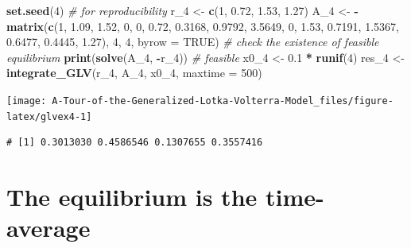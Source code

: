 \documentclass[]{book}
\newenvironment{Shaded}{\begin{snugshade}}{\end{snugshade}}
\newcommand{\CommentTok}[1]{\textcolor[rgb]{0.56,0.35,0.01}{\textit{#1}}}
\newcommand{\DataTypeTok}[1]{\textcolor[rgb]{0.13,0.29,0.53}{#1}}
\newcommand{\DecValTok}[1]{\textcolor[rgb]{0.00,0.00,0.81}{#1}}
\newcommand{\FloatTok}[1]{\textcolor[rgb]{0.00,0.00,0.81}{#1}}
\newcommand{\KeywordTok}[1]{\textcolor[rgb]{0.13,0.29,0.53}{\textbf{#1}}}
\newcommand{\NormalTok}[1]{#1}
\newcommand{\OperatorTok}[1]{\textcolor[rgb]{0.81,0.36,0.00}{\textbf{#1}}}
\newcommand{\OtherTok}[1]{\textcolor[rgb]{0.56,0.35,0.01}{#1}}
\newcommand{\StringTok}[1]{\textcolor[rgb]{0.31,0.60,0.02}{#1}}
\begin{document}
\begin{Shaded}
\begin{Highlighting}[]
\KeywordTok{set.seed}\NormalTok{(}\DecValTok{4}\NormalTok{) }\CommentTok{# for reproducibility}
\NormalTok{r_}\DecValTok{4}\NormalTok{ <-}\StringTok{ }\KeywordTok{c}\NormalTok{(}\DecValTok{1}\NormalTok{, }\FloatTok{0.72}\NormalTok{, }\FloatTok{1.53}\NormalTok{, }\FloatTok{1.27}\NormalTok{)}
\NormalTok{A_}\DecValTok{4}\NormalTok{ <-}\StringTok{ }\OperatorTok{-}\KeywordTok{matrix}\NormalTok{(}\KeywordTok{c}\NormalTok{(}\DecValTok{1}\NormalTok{, }\FloatTok{1.09}\NormalTok{, }\FloatTok{1.52}\NormalTok{, }\DecValTok{0}\NormalTok{, }
                 \DecValTok{0}\NormalTok{, }\FloatTok{0.72}\NormalTok{, }\FloatTok{0.3168}\NormalTok{, }\FloatTok{0.9792}\NormalTok{, }
                 \FloatTok{3.5649}\NormalTok{, }\DecValTok{0}\NormalTok{, }\FloatTok{1.53}\NormalTok{, }\FloatTok{0.7191}\NormalTok{,}
                 \FloatTok{1.5367}\NormalTok{, }\FloatTok{0.6477}\NormalTok{, }\FloatTok{0.4445}\NormalTok{, }\FloatTok{1.27}\NormalTok{), }\DecValTok{4}\NormalTok{, }\DecValTok{4}\NormalTok{, }\DataTypeTok{byrow =} \OtherTok{TRUE}\NormalTok{)}
\CommentTok{# check the existence of feasible equilibrium}
\KeywordTok{print}\NormalTok{(}\KeywordTok{solve}\NormalTok{(A_}\DecValTok{4}\NormalTok{, }\OperatorTok{-}\NormalTok{r_}\DecValTok{4}\NormalTok{)) }\CommentTok{# feasible}
\NormalTok{x0_}\DecValTok{4}\NormalTok{ <-}\StringTok{ }\FloatTok{0.1} \OperatorTok{*}\StringTok{ }\KeywordTok{runif}\NormalTok{(}\DecValTok{4}\NormalTok{)}
\NormalTok{res_}\DecValTok{4}\NormalTok{ <-}\StringTok{ }\KeywordTok{integrate_GLV}\NormalTok{(r_}\DecValTok{4}\NormalTok{, A_}\DecValTok{4}\NormalTok{, x0_}\DecValTok{4}\NormalTok{, }\DataTypeTok{maxtime =} \DecValTok{500}\NormalTok{)}
\end{Highlighting}
\end{Shaded}

\begin{center}\texttt{[image: A-Tour-of-the-Generalized-Lotka-Volterra-Model\_files/figure-latex/glvex4-1]} \end{center}

\begin{verbatim}
# [1] 0.3013030 0.4586546 0.1307655 0.3557416
\end{verbatim}

\hypertarget{the-equilibrium-is-the-time-average}{%
\section{The equilibrium is the time-average}\label{the-equilibrium-is-the-time-average}}
\end{document}
